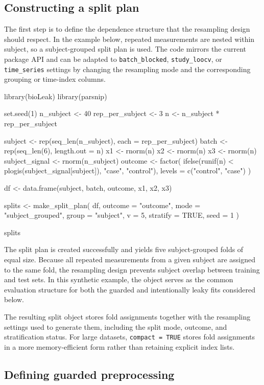 \documentclass[article]{jss}
\begin{document}
\subsection{Constructing a split plan}

The first step is to define the dependence structure that the resampling design should respect. In the example below, repeated measurements are nested within subject, so a subject-grouped split plan is used. The code mirrors the current package API and can be adapted to \texttt{batch\_blocked}, \texttt{study\_loocv}, or \texttt{time\_series} settings by changing the resampling mode and the corresponding grouping or time-index columns.


\begin{CodeInput}
library(bioLeak)
library(parsnip)

set.seed(1)
n_subject <- 40
rep_per_subject <- 3
n <- n_subject * rep_per_subject

subject <- rep(seq_len(n_subject), each = rep_per_subject)
batch <- rep(seq_len(6), length.out = n)
x1 <- rnorm(n)
x2 <- rnorm(n)
x3 <- rnorm(n)
subject_signal <- rnorm(n_subject)
outcome <- factor(
  ifelse(runif(n) < plogis(subject_signal[subject]), "case", "control"),
  levels = c("control", "case")
)

df <- data.frame(subject, batch, outcome, x1, x2, x3)

splits <- make_split_plan(
  df,
  outcome = "outcome",
  mode = "subject_grouped",
  group = "subject",
  v = 5,
  stratify = TRUE,
  seed = 1
)

splits
\end{CodeInput}


\noindent
The split plan is created successfully and yields five subject-grouped folds of equal size. Because all repeated measurements from a given subject are assigned to the same fold, the resampling design prevents subject overlap between training and test sets. In this synthetic example, the object serves as the common evaluation structure for both the guarded and intentionally leaky fits considered below.

The resulting split object stores fold assignments together with the resampling settings used to generate them, including the split mode, outcome, and stratification status. For large datasets, \texttt{compact = TRUE} stores fold assignments in a more memory-efficient form rather than retaining explicit index lists.

\subsection{Defining guarded preprocessing}
\end{document}
